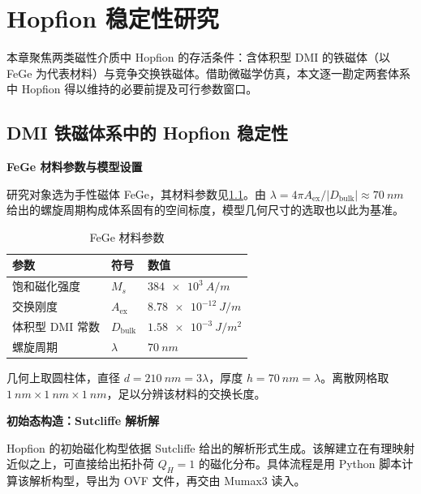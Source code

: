 \chapter{Hopfion 稳定性研究}

本章聚焦两类磁性介质中 Hopfion 的存活条件：含体积型 DMI 的铁磁体（以 FeGe 为代表材料）与竞争交换铁磁体。借助微磁学仿真，本文逐一勘定两套体系中 Hopfion 得以维持的必要前提及可行参数窗口。


\section{DMI 铁磁体系中的 Hopfion 稳定性}

\par\noindent\textbf{FeGe 材料参数与模型设置}\par\nobreak

研究对象选为手性磁体 FeGe，其材料参数见\cref{tab:fege-params}。由 $\lambda = 4\pi A_{\text{ex}} / |D_{\text{bulk}}| \approx \SI{70}{nm}$ 给出的螺旋周期构成体系固有的空间标度，模型几何尺寸的选取也以此为基准。

\begin{table}[htbp]
  \centering
  \caption{FeGe 材料参数}
  \label{tab:fege-params}
  \begin{tabular}{lll}
    \toprule
    参数 & 符号 & 数值 \\
    \midrule
    饱和磁化强度 & $M_s$ & $\SI{384e3}{A/m}$ \\
    交换刚度 & $A_{\text{ex}}$ & $\SI{8.78e-12}{J/m}$ \\
    体积型 DMI 常数 & $D_{\text{bulk}}$ & $\SI{1.58e-3}{J/m^2}$ \\
    螺旋周期 & $\lambda$ & $\SI{70}{nm}$ \\
    \bottomrule
  \end{tabular}
\end{table}

几何上取圆柱体，直径 $d = \SI{210}{nm} = 3\lambda$，厚度 $h = \SI{70}{nm} = \lambda$。离散网格取 $\SI{1}{nm} \times \SI{1}{nm} \times \SI{1}{nm}$，足以分辨该材料的交换长度。

\par\noindent\textbf{初始态构造：Sutcliffe 解析解}\par\nobreak

Hopfion 的初始磁化构型依据 Sutcliffe 给出的解析形式\cite{sutcliffe2018hopfions}生成。该解建立在有理映射近似之上，可直接给出拓扑荷 $Q_H = 1$ 的磁化分布。具体流程是用 Python 脚本计算该解析构型，导出为 OVF 文件，再交由 Mumax3 读入。

